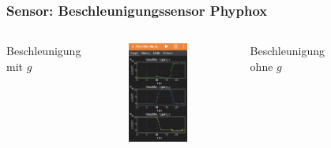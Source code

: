 \documentclass{beamer}
\begin{document}
\begin{frame}
    \frametitle{Sensor: Beschleunigungssensor Phyphox}
    \begin{columns}
        \begin{center}Beschleunigung mit $g$\end{center}
        \vspace{-0,5cm}        
        \begin{figure}[htpb]
            \centering
            \includegraphics[width=0.8\textwidth]{acc_phyphox2}
        \end{figure}
        \begin{center}Beschleunigung ohne $g$\end{center}
        \vspace{-0,5cm}
        \begin{figure}[htpb]
            \centering

\end{figure}
\end{columns}
\end{frame}
\end{document}
